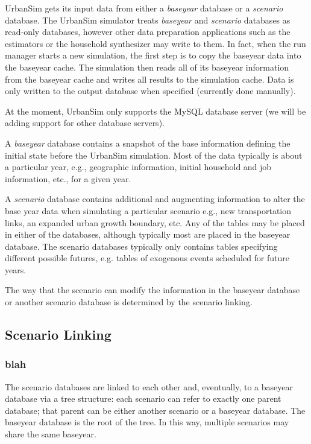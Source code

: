 UrbanSim gets its input data from either a \emph{baseyear} database or a
\emph{scenario} database.  The UrbanSim simulator treats \emph{baseyear} and
\emph{scenario} databases as read-only databases, however other data
preparation applications such as the estimators or the household synthesizer
may write to them.  In fact, when the run manager starts a new simulation, the
first step is to copy the baseyear data into the baseyear cache. The
simulation then reads all of its baseyear information from the baseyear cache
and writes all results to the simulation cache. \simulationcacheindex Data is only written to the
output database when specified (currently done manually).

At the moment, UrbanSim only supports the MySQL \mysqlindex database server (we will be
adding support for other database servers).

A \emph{baseyear} database contains a snapshot of the base
information defining the initial state before the UrbanSim
simulation. Most of the data typically is about a particular year,
e.g., geographic information, initial household and job information,
etc., for a given year.

A \emph{scenario} database contains additional and augmenting information to
alter the base year data when simulating a particular scenario e.g., new
transportation links, an expanded urban growth boundary, etc. Any of the tables
may be placed in either of the databases, although typically most are placed in
the baseyear database.  The scenario databases typically only contains tables
specifying different possible futures, e.g. tables of exogenous events
scheduled for future years.

The way that the scenario can modify the information in the baseyear database or
another scenario database is determined by the scenario linking.

\subsection{Scenario Linking}
\subsubsection{blah}

The scenario databases are linked to each other and, eventually, to a baseyear
database via a tree structure: each scenario can refer to exactly one parent
database; that parent can be either another scenario or a baseyear database.
The baseyear database is the root of the tree.  In this way, multiple scenarios
may share the same baseyear.

